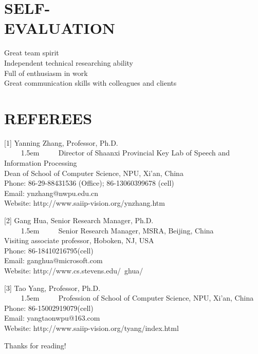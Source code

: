 \documentclass[margin]{res}
\begin{document}
\begin{resume}
\section{SELF-\\EVALUATION}
            Great team spirit\\
            Independent technical researching ability\\
            Full of enthusiasm in work\\
            Great communication skills with colleagues and clients

\section{REFEREES}
            [1] Yanning Zhang, Professor, Ph.D.\\
　　        \hangindent 1.5em
　　        \noindent
            Director of Shaanxi Provincial Key Lab of Speech and Information Processing \\
            Dean of School of Computer Science, NPU, Xi’an, China\\
            Phone: 86-29-88431536 (Office); 86-13060399678 (cell)\\
            Email: ynzhang@nwpu.edu.cn \\
            Website: http://www.saiip-vision.org/ynzhang.htm

            [2] Gang Hua, Senior Research Manager, Ph.D.\\
　　        \hangindent 1.5em
　　        \noindent
            Senior Research Manager, MSRA, Beijing, China\\
            Visiting associate professor, Hoboken, NJ, USA\\
            Phone: 86-18410216795(cell)\\
            Email: ganghua@microsoft.com\\
            Website: http://www.cs.stevens.edu/~ghua/

            [3] Tao Yang, Professor, Ph.D.\\
　　        \hangindent 1.5em
　　        \noindent
            Profession of School of Computer Science, NPU, Xi’an, China\\
            Phone: 86-15002919079(cell)\\
            Email: yangtaonwpu@163.com\\
            Website: http://www.saiip-vision.org/tyang/index.html

\hfill Thanks for reading!

\end{resume}
\end{document}
